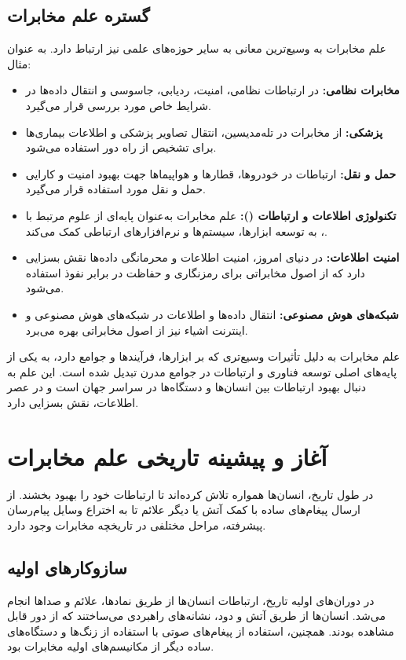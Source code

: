 \subsection{گستره علم مخابرات}
علم مخابرات به وسیع‌ترین معانی به سایر حوزه‌های علمی نیز ارتباط دارد. به عنوان مثال:
\begin{itemize}
	\item \textbf{مخابرات نظامی:} در ارتباطات نظامی، امنیت، ردیابی، جاسوسی و انتقال داده‌ها در شرایط خاص مورد بررسی قرار می‌گیرد.
	
	\item \textbf{پزشکی:} از مخابرات در تله‌مدیسین، انتقال تصاویر پزشکی و اطلاعات بیماری‌ها برای تشخیص از راه دور استفاده می‌شود.
	
	\item \textbf{حمل و نقل:} ارتباطات در خودروها، قطارها و هواپیماها جهت بهبود امنیت و کارایی حمل و نقل مورد استفاده قرار می‌گیرد.
	
	\item \textbf{تکنولوژی اطلاعات و ارتباطات ():} علم مخابرات به‌عنوان پایه‌ای از علوم مرتبط با ، به توسعه ابزارها، سیستم‌ها و نرم‌افزارهای ارتباطی کمک می‌کند.
	
	\item \textbf{امنیت اطلاعات:} در دنیای امروز، امنیت اطلاعات و محرمانگی داده‌ها نقش بسزایی دارد که از اصول مخابراتی برای رمزنگاری و حفاظت در برابر نفوذ استفاده می‌شود.
	
	\item \textbf{شبکه‌های هوش مصنوعی:} انتقال داده‌ها و اطلاعات در شبکه‌های هوش مصنوعی و اینترنت اشیاء نیز از اصول مخابراتی بهره می‌برد.
\end{itemize}

علم مخابرات به دلیل تأثیرات وسیع‌تری که بر ابزارها، فرآیندها و جوامع دارد، به یکی از پایه‌های اصلی توسعه فناوری و ارتباطات در جوامع مدرن تبدیل شده است. این علم به دنبال بهبود ارتباطات بین انسان‌ها و دستگاه‌ها در سراسر جهان است و در عصر اطلاعات، نقش بسزایی دارد.

\section{آغاز و پیشینه تاریخی علم مخابرات}

در طول تاریخ، انسان‌ها همواره تلاش کرده‌اند تا ارتباطات خود را بهبود بخشند. از ارسال پیغام‌های ساده با کمک آتش یا دیگر علائم تا به اختراع وسایل پیام‌رسان پیشرفته، مراحل مختلفی در تاریخچه مخابرات وجود دارد.

\subsection{سازوکارهای اولیه}
در دوران‌های اولیه تاریخ، ارتباطات انسان‌ها از طریق نمادها، علائم و صداها انجام می‌شد. انسان‌ها از طریق آتش و دود، نشانه‌های راهبردی می‌ساختند که از دور قابل مشاهده بودند. همچنین، استفاده از پیغام‌های صوتی با استفاده از زنگ‌ها و دستگاه‌های ساده دیگر از مکانیسم‌های اولیه مخابرات بود.

